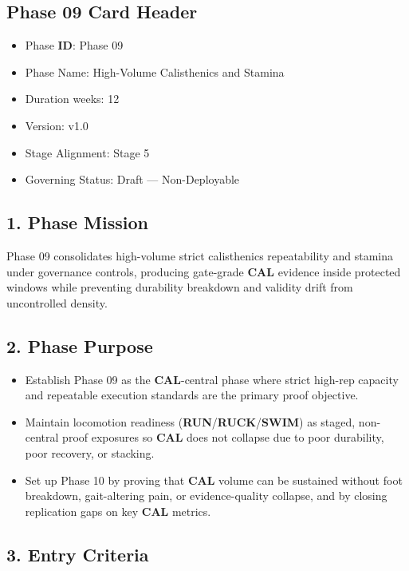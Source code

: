 \documentclass[10pt]{article}
\begin{document}
\subsection*{Phase 09 Card Header}
{}

\begin{itemize}
\item Phase \textbf{ID}: Phase 09
\item Phase Name: High-Volume Calisthenics and Stamina
\item Duration weeks: 12
\item Version: v1.0
\item Stage Alignment: Stage 5
\item Governing Status: Draft — Non-Deployable
\end{itemize}

\subsection*{1. Phase Mission}


Phase 09 consolidates high-volume strict calisthenics repeatability and stamina under governance controls, producing gate-grade \textbf{CAL} evidence inside protected windows while preventing durability breakdown and validity drift from uncontrolled density.

\subsection*{2. Phase Purpose}


\begin{itemize}
\item Establish Phase 09 as the \textbf{CAL}-central phase where strict high-rep capacity and repeatable execution standards are the primary proof objective.
\item Maintain locomotion readiness (\textbf{RUN}/\textbf{RUCK}/\textbf{SWIM}) as staged, non-central proof exposures so \textbf{CAL} does not collapse due to poor durability, poor recovery, or stacking.
\item Set up Phase 10 by proving that \textbf{CAL} volume can be sustained without foot breakdown, gait-altering pain, or evidence-quality collapse, and by closing replication gaps on key \textbf{CAL} metrics.
\end{itemize}

\subsection*{3. Entry Criteria}
\end{document}
